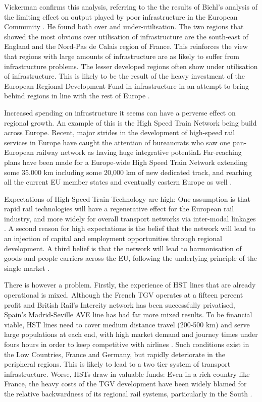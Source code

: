 Vickerman confirms this analysis, referring to the the results of Biehl's analysis of the limiting effect on output played by poor infrastructure in the European Community \citep{Biehl:1991}. He found both over and under-utilisation. The two regions that showed the most obvious over utilisation of infrastructure are the south-east of England and the Nord-Pas de Calais region of France. This reinforces the view that regions with large amounts of infrastructure are as likely to suffer from infrastructure problems. The lesser developed regions often show under utilisation of infrastructure. This is likely to be the result of the heavy investment of the European Regional Development Fund in infrastructure in an attempt to bring behind regions in line with the rest of Europe \citep{Vickerman:1994}.

Increased spending on infrastructure it seems can have a perverse effect on regional growth. An example of this is the High Speed Train Network being build across Europe. Recent, major strides in the development of high-speed rail services in Europe have caught the attention of bureaucrats who saw one pan-European railway network as having huge integrative potentiaL Far-reaching plans have been made for a Europe-wide High Speed Train Network extending some 35.000 km including some 20,000 km of new dedicated track, and reaching all the current EU member states and eventually eastern Europe as well \citep{Ross:1994}.

Expectations of High Speed Train Technology are high: One assumption is that rapid rail technologies will have a regenerative effect for the European rail industry, and more widely for overall transport networks via inter-modal linkages \citep{ECCommission:1990}. A second reason for high expectations is the belief that the network will lead to an injection of capital and employment opportunities through regional development. A third belief is that the network will lead to harmonisation of goods and people carriers across the EU, following the underlying principle of the single market \citep{Ross, 1994}.

There is however a problem. Firstly, the experience of HST lines that are already operational is mixed. Although the French TGV operates at a fifteen percent profit and British Rail's Intercity network has been successfully privatised, Spain's Madrid-Seville AVE line has had far more mixed results. To be financial viable, HST lines need to cover medium distance travel (200-500 km) and serve large populations at each end, with high market demand and journey times under fours hours in order to keep competitive with airlines \citep{Blum:1992}. Such conditions exist in the Low Countries, France and Germany, but rapidly deteriorate in the peripheral regions. This is likely to lead to a two tier system of transport infrastructure. Worse, HSTs draw in valuable funds: Even in a rich country like France, the heavy costs of the TGV development have been widely blamed for the relative backwardness of its regional rail systems, particularly in the South \citep{Vickerman:1990}.


